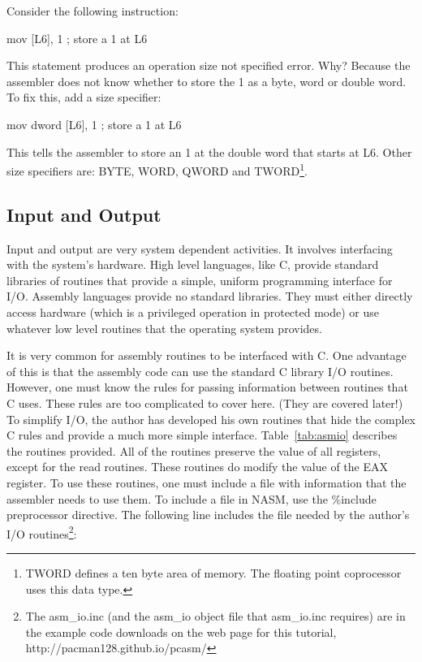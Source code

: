 Consider the following instruction:
\begin{AsmCodeListing}[frame=none, numbers=none]
      mov    [L6], 1             ; store a 1 at L6
\end{AsmCodeListing}
This statement produces an {\code operation size not specified} error. Why?
Because the assembler does not know whether to store the 1 as a byte, word
or double word. To fix this, add a size specifier:
\begin{AsmCodeListing}[frame=none, numbers=none]
      mov    dword [L6], 1       ; store a 1 at L6
\end{AsmCodeListing}
This tells the assembler to store an 1 at the double word that starts at
{\code L6}. Other size specifiers are: {\code BYTE}, {\code WORD},
{\code QWORD} and {\code TWORD}\footnote{{\code TWORD} defines a ten byte
area of memory. The floating point coprocessor uses this data type.}.

\subsection{Input and Output }

Input and output are very system dependent activities. It involves
interfacing with the system's hardware. High level languages, like C,
provide standard libraries of routines that provide a simple, uniform
programming interface for I/O.  Assembly languages provide no standard
libraries. They must either directly access hardware (which is a privileged
operation in protected mode) or use whatever low level routines that the
operating system provides.

It is very common for assembly routines to be interfaced with C. One
advantage of this is that the assembly code can use the standard C
library I/O routines.  However, one must know the rules for passing
information between routines that C uses. These rules are too
complicated to cover here. (They are covered later!) To simplify I/O,
the author has developed his own routines that hide the complex C
rules and provide a much more simple interface.  Table~\ref{tab:asmio}
describes the routines provided. All of the routines preserve the
value of all registers, except for the read routines. These routines
do modify the value of the EAX register. To use these routines, one
must include a file with information that the assembler needs to use
them.  To include a file in NASM, use the {\code \%include}
preprocessor directive. The following line includes the file needed by
the author's I/O routines\footnote{The {\code asm\_io.inc} (and the
{\code asm\_io} object file that {\code asm\_io.inc} requires) are in
the example code downloads on the web page for this tutorial, {\code
http://pacman128.github.io/pcasm/}}:
\begin{AsmCodeListing}[frame=none, numbers=none]
\end{AsmCodeListing}

